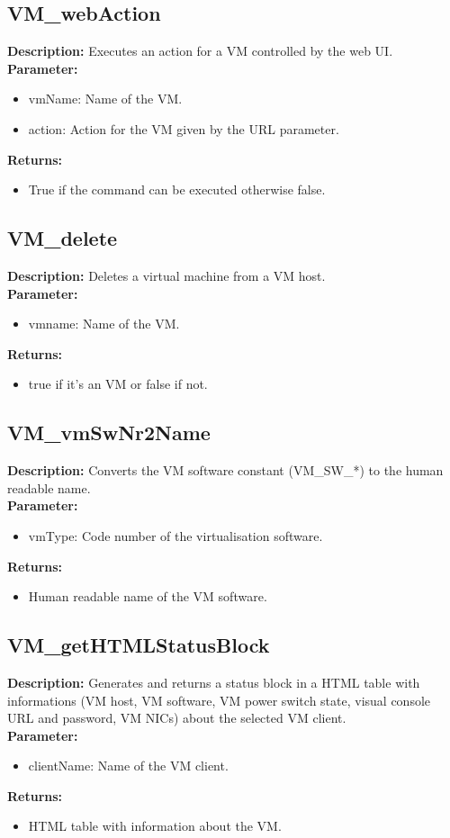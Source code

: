 \subsection{VM\_webAction}
\textbf{Description:} Executes an action for a VM controlled by the web UI.\\
\textbf{Parameter:}
\begin{itemize}
\item vmName: Name of the VM.
\item action: Action for the VM given by the URL parameter.
\end{itemize}
\textbf{Returns:}
\begin{itemize}
\item True if the command can be executed otherwise false.
\end{itemize}

\subsection{VM\_delete}
\textbf{Description:} Deletes a virtual machine from a VM host.\\
\textbf{Parameter:}
\begin{itemize}
\item vmname: Name of the VM.
\end{itemize}
\textbf{Returns:}
\begin{itemize}
\item true if it's an VM or false if not.
\end{itemize}

\subsection{VM\_vmSwNr2Name}
\textbf{Description:} Converts the VM software constant (VM\_SW\_*) to the human readable name.\\
\textbf{Parameter:}
\begin{itemize}
\item vmType: Code number of the virtualisation software.
\end{itemize}
\textbf{Returns:}
\begin{itemize}
\item Human readable name of the VM software.
\end{itemize}

\subsection{VM\_getHTMLStatusBlock}
\textbf{Description:} Generates and returns a status block in a HTML table with informations (VM host, VM software, VM power switch state, visual console URL and password, VM NICs) about the selected VM client.\\
\textbf{Parameter:}
\begin{itemize}
\item clientName: Name of the VM client.
\end{itemize}
\textbf{Returns:}
\begin{itemize}
\item HTML table with information about the VM.
\end{itemize}

